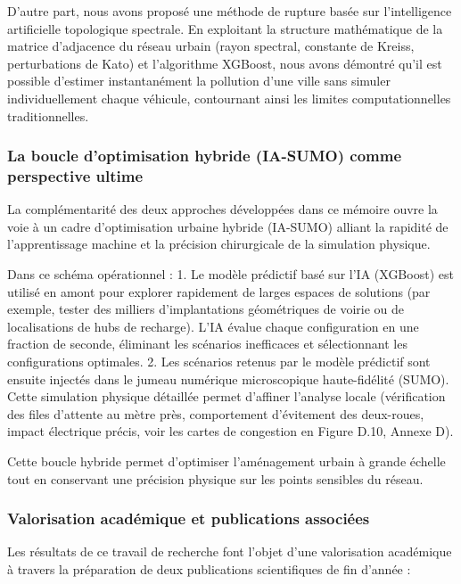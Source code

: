\documentclass[10pt, a4paper]{article}
\begin{document}
D'autre part, nous avons proposé une méthode de rupture basée sur
l'intelligence artificielle topologique spectrale. En exploitant la
structure mathématique de la matrice d'adjacence du réseau urbain (rayon
spectral, constante de Kreiss, perturbations de Kato) et l'algorithme
XGBoost, nous avons démontré qu'il est possible d'estimer instantanément
la pollution d'une ville sans simuler individuellement chaque véhicule,
contournant ainsi les limites computationnelles traditionnelles.

\subsubsection{La boucle d'optimisation hybride (IA-SUMO) comme
perspective
ultime}\label{la-boucle-doptimisation-hybride-ia-sumo-comme-perspective-ultime}

La complémentarité des deux approches développées dans ce mémoire ouvre
la voie à un cadre d'optimisation urbaine hybride (IA-SUMO) alliant la
rapidité de l'apprentissage machine et la précision chirurgicale de la
simulation physique.

Dans ce schéma opérationnel : 1. Le modèle prédictif basé sur l'IA
(XGBoost) est utilisé en amont pour explorer rapidement de larges
espaces de solutions (par exemple, tester des milliers d'implantations
géométriques de voirie ou de localisations de hubs de recharge). L'IA
évalue chaque configuration en une fraction de seconde, éliminant les
scénarios inefficaces et sélectionnant les configurations optimales. 2.
Les scénarios retenus par le modèle prédictif sont ensuite injectés dans
le jumeau numérique microscopique haute-fidélité (SUMO). Cette
simulation physique détaillée permet d'affiner l'analyse locale
(vérification des files d'attente au mètre près, comportement
d'évitement des deux-roues, impact électrique précis, voir les cartes de
congestion en Figure D.10, Annexe D).

Cette boucle hybride permet d'optimiser l'aménagement urbain à grande
échelle tout en conservant une précision physique sur les points
sensibles du réseau.

\subsubsection{Valorisation académique et publications
associées}\label{valorisation-acaduxe9mique-et-publications-associuxe9es}

Les résultats de ce travail de recherche font l'objet d'une valorisation
académique à travers la préparation de deux publications scientifiques
de fin d'année :
\end{document}
